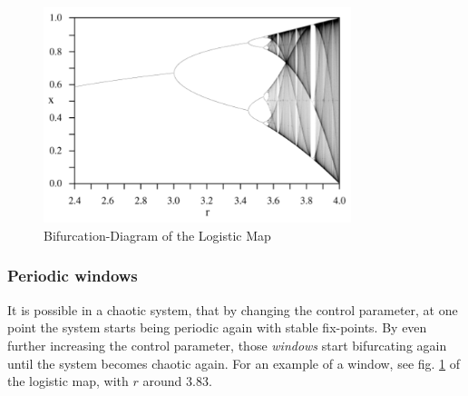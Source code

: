 \begin{figure}[H]
\centering \includegraphics[width=0.8\textwidth]{Bilder/logmap.png}
\caption{Bifurcation-Diagram of the Logistic Map}
\label{bifurcation-diagram-of-the-logistic-map}
\end{figure}

\subsubsection{Periodic windows}

It is possible in a chaotic system, that by changing the control parameter, at one point the system starts being periodic again with stable fix-points. By even further increasing the control parameter, those \emph{windows} start bifurcating again until the system becomes chaotic again. For an example of a window, see fig. \ref{bifurcation-diagram-of-the-logistic-map} of the logistic map, with $r$ around 3.83.


